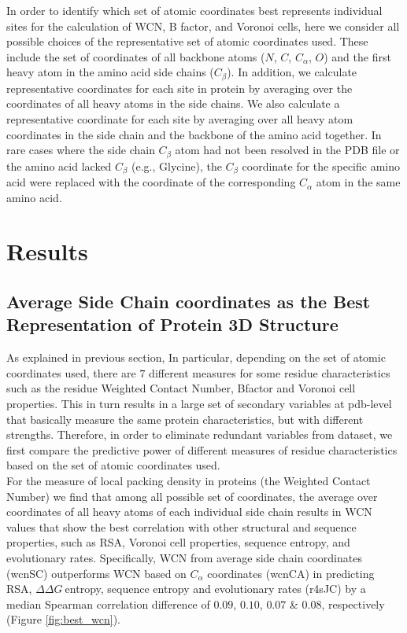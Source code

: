 \documentclass[11pt]{article}
\newcommand{\ddg}{$\Delta\Delta G~$}
\begin{document}
        In order to identify which set of atomic coordinates best represents individual sites for the calculation of WCN, B factor, and Voronoi cells, here we consider all possible choices of the representative set of atomic coordinates used. These include the set of coordinates of all backbone atoms ($N$, $C$, $C_\alpha$, $O$) and the first heavy atom in the amino acid side chains ($C_\beta$). In addition, we calculate representative coordinates for each site in protein by averaging over the coordinates of all heavy atoms in the side chains. We also calculate a representative coordinate for each site by averaging over all heavy atom coordinates in the side chain and the backbone of the amino acid together. In rare cases where the side chain $C_\beta$ atom had not been resolved in the PDB file or the amino acid lacked $C_\beta$ (e.g., Glycine), the $C_\beta$ coordinate for the specific amino acid were replaced with the coordinate of the corresponding $C_\alpha$ atom in the same amino acid. \\


\section{Results}
\label{sec:results}

    \subsection*{Average Side Chain coordinates as the Best Representation of Protein 3D Structure}

        As explained in previous section, In particular, depending on the set of atomic coordinates used, there are $7$ different measures for some residue characteristics such as the residue Weighted Contact Number, Bfactor and Voronoi cell properties. This in turn results in a large set of secondary variables at pdb-level that basically measure the same protein characteristics, but with different strengths.  Therefore, in order to eliminate redundant variables from dataset, we first compare the predictive power of different measures of residue characteristics based on the set of atomic coordinates used.
        \\

        For the measure of local packing density in proteins (the Weighted Contact Number) we find that among all possible set of coordinates, the average over coordinates of all heavy atoms of each individual side chain results in WCN values that show the best correlation with other structural and sequence properties, such as RSA, Voronoi cell properties, sequence entropy, and evolutionary rates. Specifically, WCN from average side chain coordinates (wcnSC) outperforms WCN based on $C_\alpha$ coordinates (wcnCA) in predicting RSA, \ddg entropy, sequence entropy and evolutionary rates (r4sJC) by a median Spearman correlation difference of $0.09$, $0.10$, $0.07$ \& $0.08$, respectively (Figure \ref{fig:best_wcn}).
        \\
\end{document}
